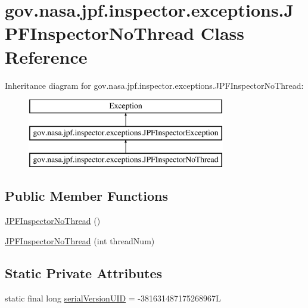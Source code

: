 \hypertarget{classgov_1_1nasa_1_1jpf_1_1inspector_1_1exceptions_1_1_j_p_f_inspector_no_thread}{}\section{gov.\+nasa.\+jpf.\+inspector.\+exceptions.\+J\+P\+F\+Inspector\+No\+Thread Class Reference}
\label{classgov_1_1nasa_1_1jpf_1_1inspector_1_1exceptions_1_1_j_p_f_inspector_no_thread}
Inheritance diagram for gov.\+nasa.\+jpf.\+inspector.\+exceptions.\+J\+P\+F\+Inspector\+No\+Thread\+:\begin{figure}[H]
\begin{center}
\leavevmode
\includegraphics[height=3.000000cm]{classgov_1_1nasa_1_1jpf_1_1inspector_1_1exceptions_1_1_j_p_f_inspector_no_thread}
\end{center}
\end{figure}
\subsection*{Public Member Functions}
\begin{DoxyCompactItemize}
\item 
\hyperlink{classgov_1_1nasa_1_1jpf_1_1inspector_1_1exceptions_1_1_j_p_f_inspector_no_thread_a1bc6cfa0de221effd0c240ccb9ccfcb7}{J\+P\+F\+Inspector\+No\+Thread} ()
\item 
\hyperlink{classgov_1_1nasa_1_1jpf_1_1inspector_1_1exceptions_1_1_j_p_f_inspector_no_thread_af5b4081a56fa3e94fb21862b75a401e9}{J\+P\+F\+Inspector\+No\+Thread} (int thread\+Num)
\end{DoxyCompactItemize}
\subsection*{Static Private Attributes}
\begin{DoxyCompactItemize}
\item 
static final long \hyperlink{classgov_1_1nasa_1_1jpf_1_1inspector_1_1exceptions_1_1_j_p_f_inspector_no_thread_a04ec2164cff83f9641b33f3f3c4775dc}{serial\+Version\+U\+ID} = -\/381631487175268967L
\end{DoxyCompactItemize}


